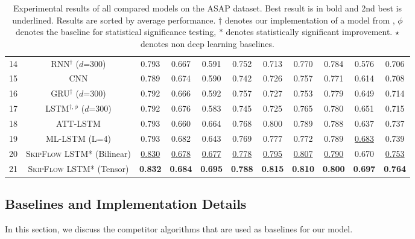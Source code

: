 \documentclass[letterpaper]{article}
\begin{document}
\begin{table*}[ht]
\begin{tabular}{|c|c|cccccccc|c|}
      
         14 & RNN$^{\dagger}$ ($d$=300)  & 0.793  & 0.667 &0.591  &0.752 & 0.713 & 0.770  & 0.784 & 0.576 & 0.706 \\
         15 & CNN & 0.789    & 0.674  & 0.590   & 0.742  & 0.726  & 0.757  & 0.771  &  0.614  & 0.708 \\ 

     16 & GRU$^{\dagger}$ ($d$=300)  & 0.792 & 0.666 & 0.592 & 0.757   & 0.727 &  0.753 & 0.779 & 0.649 & 0.714 \\
     17 & LSTM$^{\dagger, \phi}$ ($d$=300) & 0.792 & 0.676 & 0.583 & 0.745 & 0.725 & 0.765 & 0.780 & 0.651 & 0.715 \\
      18 &  ATT-LSTM  & 0.793  &  0.660  &  0.664  & 0.768  & 0.800 & 0.789 &   0.788  & 0.637 &  0.737    \\
     19 & ML-LSTM (L=4) & 0.793 &  0.682  & 0.643  &  0.769 &  0.777  & 0.772 &  0.789 &  \underline{0.683}  & 0.739 \\
     \hline
     20 & \textsc{SkipFlow} LSTM* (Bilinear) & \underline{0.830}  & \underline{0.678} & \underline{0.677} & \underline{0.778} & \underline{0.795} & \underline{0.807} & \underline{0.790}  & 0.670  & \underline{0.753} \\

     21 & \textsc{SkipFlow} LSTM* (Tensor) & \textbf{0.832} & \textbf{0.684} &    \textbf{0.695} &    \textbf{0.788} &    \textbf{0.815} &    \textbf{0.810} &    \textbf{0.800} &    \textbf{0.697} &    \textbf{0.764} \\
     \hline
     \end{tabular}\caption{Experimental results of all compared models on the ASAP dataset. Best result is in bold and 2nd best is underlined. Results are sorted by average performance. $\dagger$ denotes our implementation of a model from \cite{DBLP:conf/emnlp/TaghipourN16}, $\phi$ denotes the baseline for statistical significance testing, $*$ denotes statistically significant improvement. $\star$ denotes non deep learning baselines. }
   \label{tab:single_mdls}\end{table*}

\subsection{Baselines and Implementation Details}

In this section, we discuss the competitor algorithms that are used as baselines for our model. 
\end{document}
